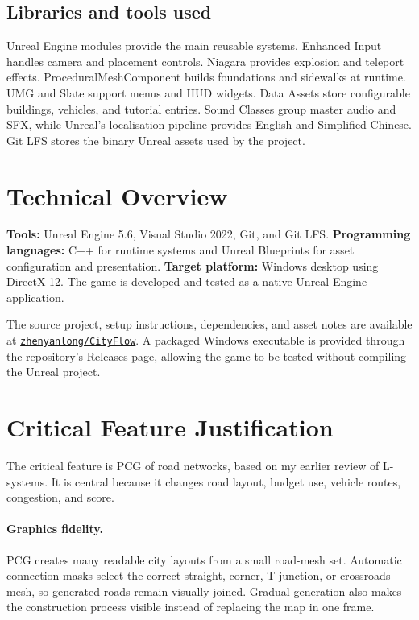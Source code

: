 \documentclass[10pt, a4paper, twocolumn]{article}
\begin{document}
\subsection{Libraries and tools used}

Unreal Engine modules provide the main reusable systems. Enhanced Input handles camera and placement controls. Niagara provides explosion and teleport effects. ProceduralMeshComponent builds foundations and sidewalks at runtime. UMG and Slate support menus and HUD widgets. Data Assets store configurable buildings, vehicles, and tutorial entries. Sound Classes group master audio and SFX, while Unreal's localisation pipeline provides English and Simplified Chinese. Git LFS stores the binary Unreal assets used by the project.

\section{Technical Overview}

\textbf{Tools:} Unreal Engine 5.6, Visual Studio 2022, Git, and Git LFS. \textbf{Programming languages:} C++ for runtime systems and Unreal Blueprints for asset configuration and presentation. \textbf{Target platform:} Windows desktop using DirectX 12. The game is developed and tested as a native Unreal Engine application.

The source project, setup instructions, dependencies, and asset notes are available at \href{https://github.com/zhenyanlong/CityFlow}{\texttt{zhenyanlong/CityFlow}}. A packaged Windows executable is provided through the repository's \href{https://github.com/zhenyanlong/CityFlow/releases}{Releases page}, allowing the game to be tested without compiling the Unreal project.

\section{Critical Feature Justification}

The critical feature is PCG of road networks, based on my earlier review of L-systems. It is central because it changes road layout, budget use, vehicle routes, congestion, and score.

\paragraph{Graphics fidelity.} PCG creates many readable city layouts from a small road-mesh set. Automatic connection masks select the correct straight, corner, T-junction, or crossroads mesh, so generated roads remain visually joined. Gradual generation also makes the construction process visible instead of replacing the map in one frame.
\end{document}
